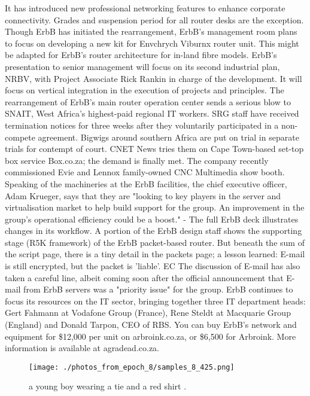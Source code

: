 \documentclass{article}%
\begin{document}
It has introduced new professional networking features to enhance corporate connectivity.\newline%
Grades and suspension period for all router desks are the exception. Though ErbB has initiated the rearrangement, ErbB's management room plans to focus on developing a new kit for Envchrych Viburnx router unit. This might be adapted for ErbB's router architecture for in{-}land fibre models.\newline%
ErbB's presentation to senior management will focus on its second industrial plan, NRBV, with Project Associate Rick Rankin in charge of the development. It will focus on vertical integration in the execution of projects and principles.\newline%
The rearrangement of ErbB's main router operation center sends a serious blow to SNAIT, West Africa's highest{-}paid regional IT workers. SRG staff have received termination notices for three weeks after they voluntarily participated in a non{-}compete agreement.\newline%
Bigwigs around southern Africa are put on trial in separate trials for contempt of court. CNET News tries them on Cape Town{-}based set{-}top box service Box.co.za; the demand is finally met. The company recently commissioned Evie and Lennox family{-}owned CNC Multimedia show booth.\newline%
Speaking of the machineries at the ErbB facilities, the chief executive officer, Adam Krueger, says that they are "looking to key players in the server and virtualisation market to help build support for the group. An improvement in the group's operational efficiency could be a boost."\newline%
{-} The full ErbB deck illustrates changes in its workflow. A portion of the ErbB design staff shows the supporting stage (R5K framework) of the ErbB packet{-}based router. But beneath the sum of the script page, there is a tiny detail in the packets page; a lesson learned: E{-}mail is still encrypted, but the packet is 'liable'. EC\newline%
The discussion of E{-}mail has also taken a careful line, albeit coming soon after the official announcement that E{-}mail from ErbB servers was a "priority issue" for the group.\newline%
ErbB continues to focus its resources on the IT sector, bringing together three IT department heads: Gert Fahmann at Vodafone Group (France), Rene Steldt at Macquarie Group (England) and Donald Tarpon, CEO of RBS.\newline%
You can buy ErbB's network and equipment for \$12,000 per unit on arbroink.co.za, or \$6,500 for Arbroink. More information is available at agradead.co.za.\newline%

%


\begin{figure}[h!]%
\centering%
\texttt{[image: ./photos\_from\_epoch\_8/samples\_8\_425.png]}%
\caption{a young boy wearing a tie and a red shirt .}%
\end{figure}

%
\end{document}
